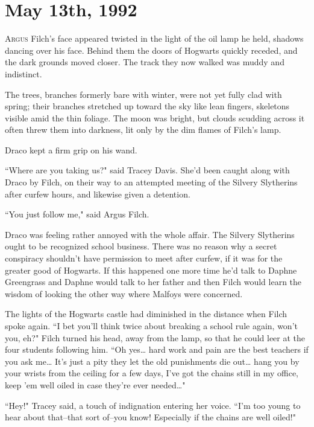 
\section{May 13th, 1992}

\lettrine{A}{rgus} Filch's face appeared twisted in the light of the oil lamp he held, shadows dancing over his face. Behind them the doors of Hogwarts quickly receded, and the dark grounds moved closer. The track they now walked was muddy and indistinct.

The trees, branches formerly bare with winter, were not yet fully clad with spring; their branches stretched up toward the sky like lean fingers, skeletons visible amid the thin foliage. The moon was bright, but clouds scudding across it often threw them into darkness, lit only by the dim flames of Filch's lamp.

Draco kept a firm grip on his wand.

``Where are you taking us?" said Tracey Davis. She'd been caught along with Draco by Filch, on their way to an attempted meeting of the Silvery Slytherins after curfew hours, and likewise given a detention.

``You just follow me," said Argus Filch.

Draco was feeling rather annoyed with the whole affair. The Silvery Slytherins ought to be recognized school business. There was no reason why a secret conspiracy shouldn't have permission to meet after curfew, if it was for the greater good of Hogwarts. If this happened one more time he'd talk to Daphne Greengrass and Daphne would talk to her father and then Filch would learn the wisdom of looking the other way where Malfoys were concerned.

The lights of the Hogwarts castle had diminished in the distance when Filch spoke again. ``I bet you'll think twice about breaking a school rule again, won't you, eh?" Filch turned his head, away from the lamp, so that he could leer at the four students following him. ``Oh yes{\ldots} hard work and pain are the best teachers if you ask me{\ldots} It's just a pity they let the old punishments die out{\ldots} hang you by your wrists from the ceiling for a few days, I've got the chains still in my office, keep 'em well oiled in case they're ever needed{\ldots}"

``Hey!" Tracey said, a touch of indignation entering her voice. ``I'm too young to hear about that\---that sort of\---you know! Especially if the chains are well oiled!"


